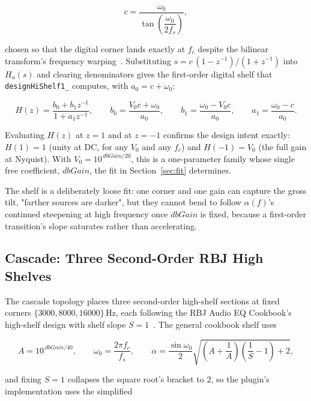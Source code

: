 \documentclass[11pt,a4paper]{article}
\begin{document}
\begin{equation}
c = \frac{\omega_0}{\tan\!\left(\dfrac{\omega_0}{2 f_s}\right)} ,
\end{equation}

chosen so that the digital corner lands exactly at $f_c$ despite the bilinear transform's frequency warping~\cite{SmithBLT,SmithFreqWarp}.
Substituting $s = c\,(1-z^{-1})/(1+z^{-1})$ into $H_a(s)$ and clearing denominators gives the first-order digital shelf that \texttt{designHiShelf1\_} computes, with $a_0 = c+\omega_0$:

\begin{equation}
H(z) = \frac{b_0 + b_1 z^{-1}}{1 + a_1 z^{-1}} ,
\qquad
b_0 = \frac{V_0 c + \omega_0}{a_0},
\qquad
b_1 = \frac{\omega_0 - V_0 c}{a_0},
\qquad
a_1 = \frac{\omega_0 - c}{a_0} .
\label{eq:shelf1}
\end{equation}

Evaluating $H(z)$ at $z=1$ and at $z=-1$ confirms the design intent exactly: $H(1) = 1$ (unity at DC, for any $V_0$ and any $f_c$) and $H(-1) = V_0$ (the full gain at Nyquist).
With $V_0 = 10^{\,\mathit{dbGain}/20}$, this is a one-parameter family whose single free coefficient, $\mathit{dbGain}$, the fit in Section~\ref{sec:fit} determines.

The shelf is a deliberately loose fit: one corner and one gain can capture the gross tilt, "farther sources are darker", but they cannot bend to follow $\alpha(f)$'s continued steepening at high frequency once $\mathit{dbGain}$ is fixed, because a first-order transition's slope saturates rather than accelerating.

\subsection{Cascade: Three Second-Order RBJ High Shelves}
\label{sec:cascade}

The cascade topology places three second-order high-shelf sections at fixed corners $\{3000, 8000, 16000\}\,\si{\hertz}$, each following the RBJ Audio EQ Cookbook's high-shelf design with shelf slope $S=1$~\cite{RBJCookbook}.
The general cookbook shelf uses

\begin{equation}
A = 10^{\,\mathit{dbGain}/40}, \qquad
\omega_0 = \frac{2\pi f_c}{f_s}, \qquad
\alpha = \frac{\sin\omega_0}{2}\sqrt{\left(A+\frac{1}{A}\right)\!\left(\frac{1}{S}-1\right)+2} ,
\end{equation}

and fixing $S=1$ collapses the square root's bracket to $2$, so the plugin's implementation uses the simplified
\end{document}
